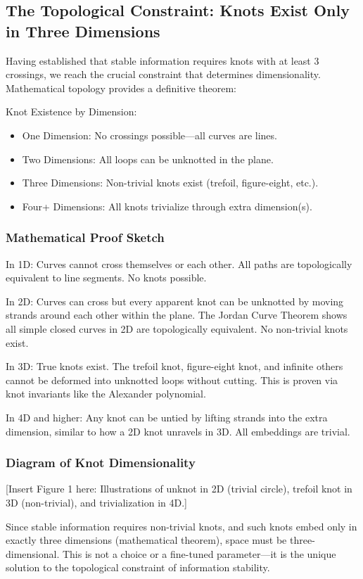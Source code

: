 \documentclass{article}
\begin{document}
\subsection{The Topological Constraint: Knots Exist Only in Three Dimensions}
Having established that stable information requires knots with at least 3 crossings, we reach the crucial constraint that determines dimensionality. Mathematical topology provides a definitive theorem:

Knot Existence by Dimension:
\begin{itemize}
\item One Dimension: No crossings possible—all curves are lines.
\item Two Dimensions: All loops can be unknotted in the plane.
\item Three Dimensions: Non-trivial knots exist (trefoil, figure-eight, etc.).
\item Four+ Dimensions: All knots trivialize through extra dimension(s).
\end{itemize}

\subsubsection{Mathematical Proof Sketch}
In 1D: Curves cannot cross themselves or each other. All paths are topologically equivalent to line segments. No knots possible.

In 2D: Curves can cross but every apparent knot can be unknotted by moving strands around each other within the plane. The Jordan Curve Theorem shows all simple closed curves in 2D are topologically equivalent. No non-trivial knots exist.

In 3D: True knots exist. The trefoil knot, figure-eight knot, and infinite others cannot be deformed into unknotted loops without cutting. This is proven via knot invariants like the Alexander polynomial.

In 4D and higher: Any knot can be untied by lifting strands into the extra dimension, similar to how a 2D knot unravels in 3D. All embeddings are trivial.

\subsubsection{Diagram of Knot Dimensionality}
[Insert Figure 1 here: Illustrations of unknot in 2D (trivial circle), trefoil knot in 3D (non-trivial), and trivialization in 4D.]

Since stable information requires non-trivial knots, and such knots embed only in exactly three dimensions (mathematical theorem), space must be three-dimensional. This is not a choice or a fine-tuned parameter—it is the unique solution to the topological constraint of information stability.
\end{document}

